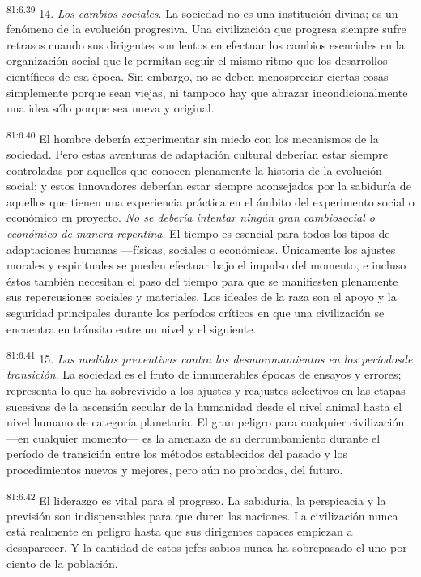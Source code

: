 \par
\textsuperscript{81:6.39} 14. \textit{Los cambios sociales}. La sociedad no es una institución divina; es un fenómeno de la evolución progresiva. Una civilización que progresa siempre sufre retrasos cuando sus dirigentes son lentos en efectuar los cambios esenciales en la organización social que le permitan seguir el mismo ritmo que los desarrollos científicos de esa época. Sin embargo, no se deben menospreciar ciertas cosas simplemente porque sean viejas, ni tampoco hay que abrazar incondicionalmente una idea sólo porque sea nueva y original.

\par
\textsuperscript{81:6.40} El hombre debería experimentar sin miedo con los mecanismos de la sociedad. Pero estas aventuras de adaptación cultural deberían estar siempre controladas por aquellos que conocen plenamente la historia de la evolución social; y estos innovadores deberían estar siempre aconsejados por la sabiduría de aquellos que tienen una experiencia práctica en el ámbito del experimento social o económico en proyecto. \textit{No se debería intentar ningún gran cambiosocial o económico de manera repentina}. El tiempo es esencial para todos los tipos de adaptaciones humanas ---físicas, sociales o económicas. Únicamente los ajustes morales y espirituales se pueden efectuar bajo el impulso del momento, e incluso éstos también necesitan el paso del tiempo para que se manifiesten plenamente sus repercusiones sociales y materiales. Los ideales de la raza son el apoyo y la seguridad principales durante los períodos críticos en que una civilización se encuentra en tránsito entre un nivel y el siguiente.

\par
\textsuperscript{81:6.41} 15. \textit{Las medidas preventivas contra los desmoronamientos en los períodosde transición}. La sociedad es el fruto de innumerables épocas de ensayos y errores; representa lo que ha sobrevivido a los ajustes y reajustes selectivos en las etapas sucesivas de la ascensión secular de la humanidad desde el nivel animal hasta el nivel humano de categoría planetaria. El gran peligro para cualquier civilización ---en cualquier momento--- es la amenaza de su derrumbamiento durante el período de transición entre los métodos establecidos del pasado y los procedimientos nuevos y mejores, pero aún no probados, del futuro.

\par
\textsuperscript{81:6.42} El liderazgo es vital para el progreso. La sabiduría, la perspicacia y la previsión son indispensables para que duren las naciones. La civilización nunca está realmente en peligro hasta que sus dirigentes capaces empiezan a desaparecer. Y la cantidad de estos jefes sabios nunca ha sobrepasado el uno por ciento de la población.


